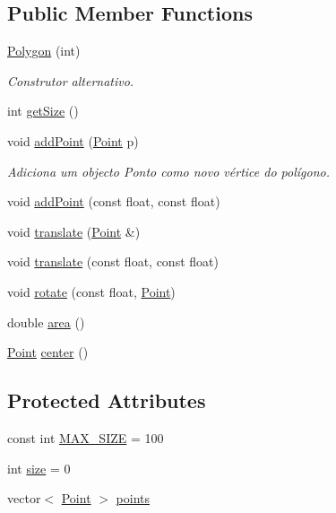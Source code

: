 \subsection*{Public Member Functions}
\begin{DoxyCompactItemize}
\item 
\hyperlink{class_polygon_af7bc02fdd1541b49aa3f8e2006a30aad}{Polygon} (int)
\begin{DoxyCompactList}\small\item\em Construtor alternativo. \end{DoxyCompactList}\item 
int \hyperlink{class_polygon_a9c28d2deb649781c79a21cee4d884403}{get\+Size} ()
\item 
void \hyperlink{class_polygon_aa7b6a280681bf36afc977f4bd3bcc8d3}{add\+Point} (\hyperlink{class_point}{Point} p)
\begin{DoxyCompactList}\small\item\em Adiciona um objecto Ponto como novo vértice do polígono. \end{DoxyCompactList}\item 
void \hyperlink{class_polygon_a639bed3c0635559f7db23f4fa4e54d89}{add\+Point} (const float, const float)
\item 
void \hyperlink{class_polygon_a5a514d6e28bb6f5e1bccd007e75bb512}{translate} (\hyperlink{class_point}{Point} \&)
\item 
void \hyperlink{class_polygon_ae9ccf7a74ff5ac4dcc776d0e334d9d55}{translate} (const float, const float)
\item 
void \hyperlink{class_polygon_ae56a4c0d4e77bbbe8fa423ca5d33622a}{rotate} (const float, \hyperlink{class_point}{Point})
\item 
double \hyperlink{class_polygon_aaf8aa88f54ac596898c20261f40f77f0}{area} ()
\item 
\hyperlink{class_point}{Point} \hyperlink{class_polygon_a29f2c1c836f16108ea14567728cda0c2}{center} ()
\end{DoxyCompactItemize}
\subsection*{Protected Attributes}
\begin{DoxyCompactItemize}
\item 
const int \hyperlink{class_polygon_ab6ae45da59b24da7c101721dfa784690}{M\+A\+X\+\_\+\+S\+I\+ZE} = 100
\item 
int \hyperlink{class_polygon_aba87c61b99a3812696145bda9e3f466a}{size} = 0
\item 
vector$<$ \hyperlink{class_point}{Point} $>$ \hyperlink{class_polygon_a2d68fb877efd74fd52ea4dea28ea4169}{points}
\end{DoxyCompactItemize}
